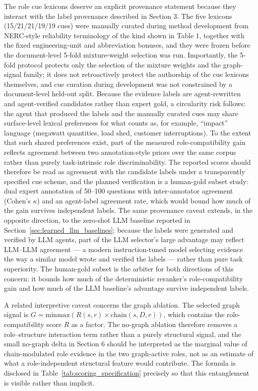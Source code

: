 \documentclass{ieeeaccess}
\begin{document}
\label{sec:cue_lexicon_construction_and_circularity}

The role cue lexicons deserve an explicit provenance statement because they interact with the label provenance described in Section 3. The five lexicons (15/21/21/19/19 cues) were manually curated during method development from NERC-style reliability terminology of the kind shown in Table 1, together with the fixed engineering-unit and abbreviation bonuses, and they were frozen before the document-level 5-fold mixture-weight selection was run. Importantly, the 5-fold protocol protects only the selection of the mixture weights and the graph-signal family; it does not retroactively protect the authorship of the cue lexicons themselves, and cue curation during development was not constrained by a document-level held-out split. Because the evidence labels are agent-rewritten and agent-verified candidates rather than expert gold, a circularity risk follows: the agent that produced the labels and the manually curated cues may share surface-level lexical preferences for what counts as, for example, ``impact'' language (megawatt quantities, load shed, customer interruptions). To the extent that such shared preferences exist, part of the measured role-compatibility gain reflects agreement between two annotation-style priors over the same corpus rather than purely task-intrinsic role discriminability. The reported scores should therefore be read as agreement with the candidate labels under a transparently specified cue scheme, and the planned verification is a human-gold subset study: dual expert annotation of 50--100 questions with inter-annotator agreement (Cohen's \(\kappa\)) and an agent-label agreement rate, which would bound how much of the gain survives independent labels. The same provenance caveat extends, in the opposite direction, to the zero-shot LLM baseline reported in Section~\ref{sec:learned_llm_baselines}: because the labels were generated and verified by LLM agents, part of the LLM selector's large advantage may reflect LLM--LLM agreement --- a modern instruction-tuned model selecting evidence the way a similar model wrote and verified the labels --- rather than pure task superiority. The human-gold subset is the arbiter for both directions of this concern: it bounds how much of the deterministic reranker's role-compatibility gain and how much of the LLM baseline's advantage survive independent labels.

A related interpretive caveat concerns the graph ablation. The selected graph signal is \(G=\mathrm{minmax}(R(s,r)\times \mathrm{chain}(s,D,r))\), which contains the role-compatibility score \(R\) as a factor. The no-graph ablation therefore removes a role--structure interaction term rather than a purely structural signal, and the small no-graph delta in Section 6 should be interpreted as the marginal value of chain-modulated role evidence in the two graph-active roles, not as an estimate of what a role-independent structural feature would contribute. The formula is disclosed in Table~\ref{tab:scoring_specification} precisely so that this entanglement is visible rather than implicit.
\end{document}
